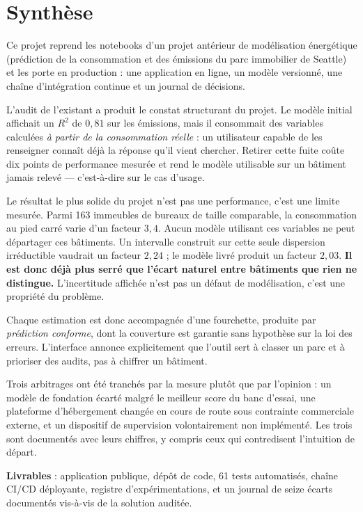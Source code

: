 \section*{Synthèse}

Ce projet reprend les notebooks d'un projet antérieur de modélisation énergétique
(prédiction de la consommation et des émissions du parc immobilier de Seattle) et
les porte en production : une application en ligne, un modèle versionné, une
chaîne d'intégration continue et un journal de décisions.

L'audit de l'existant a produit le constat structurant du projet. Le modèle
initial affichait un $R^2$ de $0{,}81$ sur les émissions, mais il consommait des
variables calculées \emph{à partir de la consommation réelle} : un utilisateur
capable de les renseigner connaît déjà la réponse qu'il vient chercher. Retirer
cette fuite coûte dix points de performance mesurée et rend le modèle utilisable
sur un bâtiment jamais relevé — c'est-à-dire sur le cas d'usage.

\begin{constat}{Le résultat le plus solide du projet n'est pas une performance, c'est une limite mesurée.}
Parmi 163 immeubles de bureaux de taille comparable, la consommation au pied
carré varie d'un facteur $3{,}4$. Aucun modèle utilisant ces variables ne peut
départager ces bâtiments. Un intervalle construit sur cette seule dispersion
irréductible vaudrait un facteur $2{,}24$ ; le modèle livré produit un facteur
$2{,}03$. \textbf{Il est donc déjà plus serré que l'écart naturel entre bâtiments
que rien ne distingue.} L'incertitude affichée n'est pas un défaut de
modélisation, c'est une propriété du problème.
\end{constat}

Chaque estimation est donc accompagnée d'une fourchette, produite par
\emph{prédiction conforme}, dont la couverture est garantie sans hypothèse sur la
loi des erreurs. L'interface annonce explicitement que l'outil sert à classer un
parc et à prioriser des audits, pas à chiffrer un bâtiment.

Trois arbitrages ont été tranchés par la mesure plutôt que par l'opinion : un
modèle de fondation écarté malgré le meilleur score du banc d'essai, une
plateforme d'hébergement changée en cours de route sous contrainte commerciale
externe, et un dispositif de supervision volontairement non implémenté. Les trois
sont documentés avec leurs chiffres, y compris ceux qui contredisent l'intuition
de départ.

\vspace{0.6em}
\noindent\textbf{Livrables} : application publique, dépôt de code, 61 tests
automatisés, chaîne CI/CD déployante, registre d'expérimentations, et un journal
de seize écarts documentés vis-à-vis de la solution auditée.

\newpage

